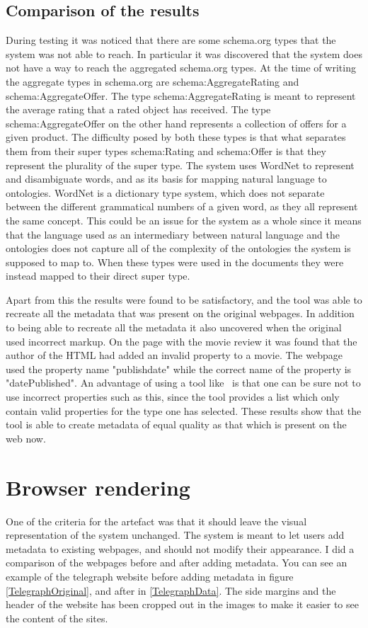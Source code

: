 \subsection{Comparison of the results}
During testing it was noticed that there are some schema.org types that the system was not able to reach.
In particular it was discovered that the system does not have a way to reach the aggregated schema.org types.
At the time of writing the aggregate types in schema.org are schema:AggregateRating and schema:AggregateOffer.
The type schema:AggregateRating is meant to represent the average rating that a rated object has received.
The type schema:AggregateOffer on the other hand represents a collection of offers for a given product.
The difficulty posed by both these types is that what separates them from their super types schema:Rating and schema:Offer
is that they represent the plurality of the super type.
The system uses WordNet to represent and disambiguate words, and as its basis for mapping natural language to ontologies.
WordNet is a dictionary type system, which does not separate between the different grammatical numbers of a given word,
as they all represent the same concept.
This could be an issue for the system as a whole since it means that the language used as an intermediary between natural language
and the ontologies does not capture all of the complexity of the ontologies the system is supposed to map to.
When these types were used in the documents they were instead mapped to their direct super type.

Apart from this the results were found to be satisfactory,
and the tool was able to recreate all the metadata that was present on the original webpages.
In addition to being able to recreate all the metadata it also uncovered when the original used incorrect markup.
On the page with the movie review it was found that the author of the HTML had added an invalid property to a movie.
The webpage used the property name "publishdate" while the correct name of the property is "datePublished".
An advantage of using a tool like \theartefact\ is that one can be sure not to use incorrect properties such as this,
since the tool provides a list which only contain valid properties for the type one has selected.
These results show that the tool is able to create metadata of equal quality as that which is present on the web now.

\section{Browser rendering}
\label{Rendering}
One of the criteria for the artefact was that it should leave the visual representation of the system unchanged.
The system is meant to let users add metadata to existing webpages, and should not modify their appearance.
I did a comparison of the webpages before and after adding metadata.
You can see an example of the telegraph website before adding metadata in figure \ref{TelegraphOriginal},
and after in \ref{TelegraphData}.
The side margins and the header of the website has been cropped out in the images to make it easier to see the content of the sites.

